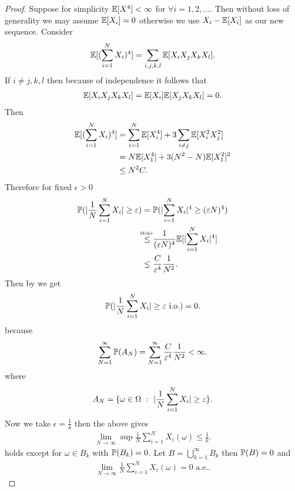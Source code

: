 \begin{proof}
  Suppose for simplicity $\E[X^{4} ] < \infty$  for $\forall  i = 1,2,\ldots $.
  Then without loss of generality we may assume $\E[X_i] = 0$ otherwise we use $X_i - \E[X_i]$ as our new sequence.
  Consider 
  \begin{align*}
    \E[(\sum_{i=1}^{N} X_i )^{4} ] = \sum_{i,j,k,l}\E[X_iX_jX_kX_l]
  .\end{align*}
  If $i \neq j ,k,l$ then because of independence it follows that 
  \begin{align*}
    \E[X_iX_jX_kX_l] = \E[X_i]\E[X_jX_kX_l] = 0
  .\end{align*}
  Then 
  \begin{align*}
    \E[(\sum_{i=1}^{N}X_i )^{4} ] &= \sum_{i=1}^{N}\E[X_i^{4} ]  + 3 \sum_{i\neq j}\E[X_i^2X_j^2] \\
                                  &= N\E[X_{1}^{4} ] + 3(N^2-N)\E[X_{1}^2]^2 \\
                                  &\le  N^2C
  .\end{align*}
  Therefore for fixed $\epsilon > 0$
  \begin{align*}
    \P(\abs{\frac{1}{N} \sum_{i=1}^{N}X_i } \ge \epsilon) &= \P(\abs{\sum_{i=1}^{N}X_i }^{4}  \ge (\epsilon N)^{4} )\\
                                                          &\myS{Mrkv.}{\le} \frac{1}{(\epsilon N)^{4} } \E[\abs{\sum_{i=1}^{N} X_i }^{4} ]\\
                                                          &\le  \frac{C}{\epsilon^4}\frac{1}{N^2}
  .\end{align*}
  Then by  we get 
  \begin{align*}
    \P(\abs{\frac{1}{N} \sum_{i=1}^{N} X_i } \ge  \epsilon \text{ i.o.}) = 0
  .\end{align*}
  because 
  \begin{align*}
    \sum_{N=1}^{\infty} \P(A_N)  = \sum_{N=1}^{\infty} \frac{C}{\epsilon^4}\frac{1}{N^2}  < \infty
  .\end{align*}
  where  
  \begin{align*}
    A_N = \{\omega  \in  \Omega  \ : \ \abs{\frac{1}{N}\sum_{i=1}^{N}X_i } \ge  \epsilon\}  
  .\end{align*}
  Now we take $\epsilon = \frac{1}{k}$ then the above gives 
  \begin{align*}
    \lim_{N\to \infty} \sup \frac{1}{N} \sum_{i=1}^{N}  X_i(\omega ) \le \frac{1}{k}
  .\end{align*}
  holds except for $\omega  \in  B_k$ with $\P(B_k) = 0$. Let $B = \bigcup_{k=1}^{\infty} B_k $ then $\P(B) = 0$ and
  \begin{align*}
    \lim_{N \to \infty} \frac{1}{N} \sum_{i=1}^{N} X_i(\omega ) = 0  \text{ a.e.}
  .\end{align*}
\end{proof}
